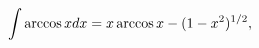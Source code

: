 \[\int\mathop{\mathrm{arccos}\/}\nolimits xdx=x\mathop{\mathrm{arccos}\/}%
\nolimits x-(1-x^{2})^{1/2},\]